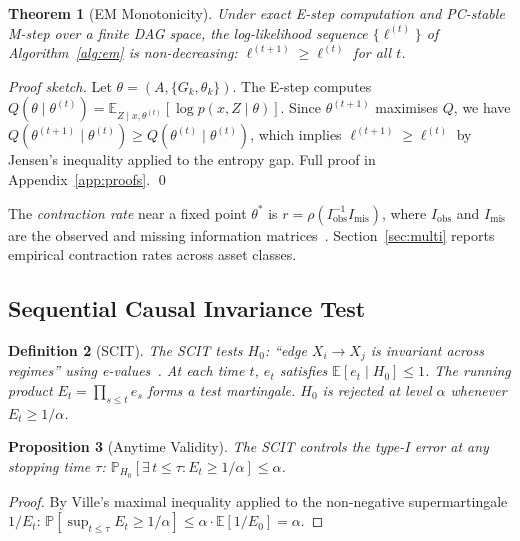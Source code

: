 \documentclass[11pt]{article}
\newtheorem{theorem}{Theorem}
\newtheorem{definition}[theorem]{Definition}
\newtheorem{proposition}[theorem]{Proposition}
\newcommand{\E}{\mathbb{E}}
\newcommand{\Prob}{\mathbb{P}}
\begin{document}
\begin{theorem}[EM Monotonicity]\label{thm:em}
Under exact E-step computation and PC-stable M-step over a finite DAG
space, the log-likelihood sequence $\{\ell^{(t)}\}$ of
Algorithm~\ref{alg:em} is non-decreasing:
$\ell^{(t+1)} \geq \ell^{(t)}$ for all $t$.
\end{theorem}

\noindent\emph{Proof sketch.}
Let $\theta = (A, \{G_k, \theta_k\})$.  The E-step computes
$Q(\theta \mid \theta^{(t)}) = \E_{Z \mid x, \theta^{(t)}}
[\log p(x, Z \mid \theta)]$.  Since $\theta^{(t+1)}$ maximises $Q$,
we have $Q(\theta^{(t+1)} \mid \theta^{(t)}) \geq
Q(\theta^{(t)} \mid \theta^{(t)})$, which implies
$\ell^{(t+1)} \geq \ell^{(t)}$ by Jensen's inequality applied to
the entropy gap.  Full proof in Appendix~\ref{app:proofs}. \qed

The \emph{contraction rate} near a fixed point $\theta^*$ is
$r = \rho(I_{\mathrm{obs}}^{-1} I_{\mathrm{mis}})$, where
$I_{\mathrm{obs}}$ and $I_{\mathrm{mis}}$ are the observed and
missing information matrices~\cite{dempster1977maximum}.  Section~\ref{sec:multi} reports
empirical contraction rates across asset classes.

\subsection{Sequential Causal Invariance Test}\label{sec:scit}

\begin{definition}[SCIT]\label{def:scit}
The SCIT tests $H_0$: ``edge $X_i \to X_j$ is invariant across
regimes'' using e-values~\cite{grunwald2024safe}.  At each time $t$,
$e_t$ satisfies $\E[e_t \mid H_0] \leq 1$.  The running product
$E_t = \prod_{s \leq t} e_s$ forms a test martingale.  $H_0$ is
rejected at level $\alpha$ whenever $E_t \geq 1/\alpha$.
\end{definition}

\begin{proposition}[Anytime Validity]\label{prop:anytime}
The SCIT controls the type-I error at any stopping time $\tau$:
$\Prob_{H_0}[\exists\, t \leq \tau : E_t \geq 1/\alpha] \leq \alpha$.
\end{proposition}

\begin{proof}
By Ville's maximal inequality applied to the non-negative
supermartingale $1/E_t$:
$\Prob[\sup_{t \leq \tau} E_t \geq 1/\alpha]
\leq \alpha \cdot \E[1/E_0] = \alpha$.
\end{proof}
\end{document}
